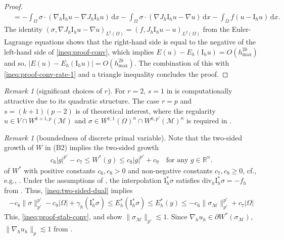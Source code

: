 \documentclass[a4paper]{amsart}
\numberwithin{equation}{section}
\newcommand{\R}{\mathbb{R}}
\renewcommand{\d}[1]{\,\mathrm{d}#1}
\renewcommand{\div}{\mathrm{div}}
\newcommand{\I}{\mathrm{I}}
\newcommand{\Mcal}{\mathcal{M}}
\theoremstyle{remark}
\newtheorem{remark}[theorem]{Remark}
\begin{document}
\begin{proof}
\begin{align*}
		&= - \int_\Omega \sigma \cdot (\nabla_h \mathrm{I}_h u - \nabla J_h \mathrm{I}_h u) \d{x} - \int_\Omega \sigma \cdot (\nabla J_h \mathrm{I}_h u - \nabla u) \d{x} - \int_\Omega f(u - \I_h u) \d{x}.
	\end{align*}
    The identity $(\sigma, \nabla J_h \mathrm{I}_h u - \nabla u)_{L^2(\Omega)} = (f, J_h \mathrm{I}_h u - u)_{L^2(\Omega)}$ from the Euler-Lagrange equations shows that the right-hand side is equal to the negative of the left-hand side of \eqref{ineq:proof-conv}, which implies $E(u) - E_h(\mathrm{I}_h u)
    =O(h_\mathrm{max}^{2k}) $%
    and so, $|E(u) - E_h(\mathrm{I}_h u)| =O(h_\mathrm{max}^{2k}) $.%
    The combination of this with \eqref{ineq:proof-conv-rate-1} and a triangle inequality concludes the proof.
\end{proof}
\begin{remark}[significant choices of $r$]
	For $r = 2$, $s = 1$ in  is computationally attractive due to its quadratic structure. The case $r = p$ and $s = (k+1)(p-2)$ is of theoretical interest, where the regularity $u \in V \cap W^{k+1,p}(\Mcal)$ and $\sigma \in W^{1,1}(\Omega)^n \cap W^{k,p'}(\Mcal)^n$ is required in .
\end{remark}
\begin{remark}[boundedness of discrete primal variable]\label{rem:bound-d-primal-variable}
	Note that the two-sided growth of $W$ in (B2) implies the two-sided growth
	\begin{align}\label{ineq:two-sided-dual}
		c_6|g|^{p'} - c_7 \leq W^*(g) \leq c_8|g|^{p'} + c_9 \quad\text{for any } g \in \R^n.
	\end{align}
	of $W^*$ with positive constants $c_6,c_8 > 0$ and non-negative constants $c_7,c_9 \geq 0$, cf., e.g., \cite[Lemma 2.1(b)]{CarstensenTran2021}. Under the assumptions of , the interpolation $\I_h^* \sigma$  satisfies $\div_h \I_h^* \sigma = - f_h$ from . Thus, \eqref{ineq:two-sided-dual} implies
	\begin{align*}
		-c_8\|\sigma\|_{p'}^{p'} - c_9|\Omega| + \gamma_h(\I_h^* \sigma) \leq E_h^*(\I_h^* \sigma) \leq E^*_h(y) \leq -c_6\|\sigma_\Mcal\|_{p'}^{p'} + c_7|\Omega|
	\end{align*}
	This, \eqref{ineq:proof-stab-conv}, and  show $\|\sigma_\Mcal\|_{p'} \lesssim 1$. Since $\nabla_h u_h \in \partial W^*(\sigma_\Mcal)$, $\|\nabla_h u_h\|_p \lesssim 1$ from \cite[Lemma 2.1(c)]{CarstensenTran2021}.
\end{remark}
\end{document}
